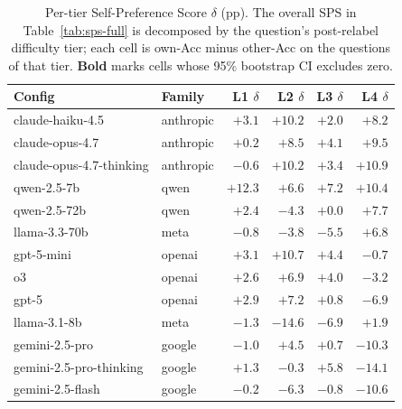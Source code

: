 \begin{table}[H]
  \centering
  \footnotesize
  \caption{Per-tier Self-Preference Score $\delta$ (pp). The overall
    SPS in Table~\ref{tab:sps-full} is decomposed by the question's
    post-relabel difficulty tier; each cell is own-Acc minus other-Acc
    on the questions of that tier. \textbf{Bold} marks cells whose
    95\% bootstrap CI excludes zero.}
  \label{tab:sps-by-tier}
  \begin{tabular}{llrrrr}
    \toprule
    Config & Family & L1 $\delta$ & L2 $\delta$ & L3 $\delta$ & L4 $\delta$ \\
    \midrule
    claude-haiku-4.5         & anthropic & $+3.1$           & $\mathbf{+10.2}$ & $+2.0$           & $+8.2$            \\
    claude-opus-4.7          & anthropic & $+0.2$           & $\mathbf{+8.5}$  & $+4.1$           & $\mathbf{+9.5}$   \\
    claude-opus-4.7-thinking & anthropic & $-0.6$           & $\mathbf{+10.2}$ & $+3.4$           & $\mathbf{+10.9}$  \\
    qwen-2.5-7b              & qwen      & $\mathbf{+12.3}$ & $+6.6$           & $+7.2$           & $\mathbf{+10.4}$  \\
    qwen-2.5-72b             & qwen      & $+2.4$           & $-4.3$           & $+0.0$           & $\mathbf{+7.7}$   \\
    llama-3.3-70b            & meta      & $-0.8$           & $-3.8$           & $-5.5$           & $+6.8$            \\
    gpt-5-mini               & openai    & $\mathbf{+3.1}$  & $\mathbf{+10.7}$ & $+4.4$           & $-0.7$            \\
    o3                       & openai    & $\mathbf{+2.6}$  & $\mathbf{+6.9}$  & $+4.0$           & $-3.2$            \\
    gpt-5                    & openai    & $\mathbf{+2.9}$  & $\mathbf{+7.2}$  & $+0.8$           & $-6.9$            \\
    llama-3.1-8b             & meta      & $-1.3$           & $\mathbf{-14.6}$ & $-6.9$           & $+1.9$            \\
    gemini-2.5-pro           & google    & $-1.0$           & $+4.5$           & $+0.7$           & $\mathbf{-10.3}$  \\
    gemini-2.5-pro-thinking  & google    & $\mathbf{+1.3}$  & $-0.3$           & $+5.8$           & $\mathbf{-14.1}$  \\
    gemini-2.5-flash         & google    & $-0.2$           & $-6.3$           & $-0.8$           & $\mathbf{-10.6}$  \\
    \bottomrule
  \end{tabular}
\end{table}

